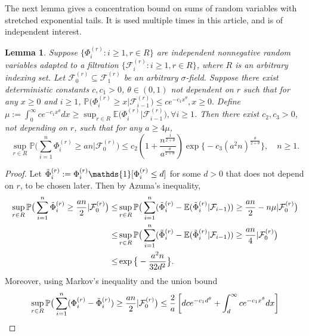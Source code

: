 \documentclass[11pt, reqno]{article}
\newtheorem{lemma}[theorem]{Lemma}
\numberwithin{equation}{section}
\numberwithin{theorem}{section}
\begin{document}
\begin{appendix}
The next lemma gives a concentration bound on sums of random variables with stretched exponential tails. It is used multiple times in this article, and is of independent interest.
\begin{lemma}\label{lem:LEMMA-5}
Suppose $\{\Phi^{(r)}_i:i\geq 1,r\in R\}$ are independent nonnegative random variables adapted to a filtration $\big\{\mathcal{F}^{(r)}_i:i\geq 1, r\in R\big\}$, where $R$ is an arbitrary indexing set. Let $\mathcal{F}^{(r)}_0\subseteq \mathcal{F}^{(r)}_1$ be an arbitrary $\sigma$-field. Suppose there exist deterministic constants $c,c_1>0$, $\theta \in (0,1)$ not dependent on $r$  such that for any $x\geq0$ and $i\geq 1$, $\mathbb{P}\big(\Phi^{(r)}_i\geq x|\mathcal{F}^{(r)}_{i-1}\big)\leq ce^{-c_1x^{\theta}},x\geq 0.$
Define $\mu :=\int_0^{\infty}ce^{-c_1x^{\theta}} dx\geq \sup_{r\in R}\mathbb{E}\big(\Phi^{(r)}_i|\mathcal{F}^{(r)}_{i-1}\big),\forall i\geq 1$.
Then there exist $c_2,c_3>0$, not depending on $r$, such that for any $a\geq 4\mu $,
$$\sup_{r\in R}\mathbb{P}\big(\sum_{i=1}^{n}\Phi^{(r)}_i \geq an|\mathcal{F}^{(r)}_0\big)\leq c_2\left(1+\frac{n^{\frac{1}{2+\theta}}}{a^{\frac{\theta}{2+\theta}}}\right)\exp \big\{-c_3(a^2n)^{\frac{\theta}{2+\theta}}\big\},\quad n\geq 1.$$
\end{lemma}
\begin{proof}
Let $\Tilde{\Phi}^{(r)}_i:=\Phi^{(r)}_i\mathds{1}[\Phi^{(r)}_i\leq d]$ for some $d>0$ that does not depend on $r$, to be chosen later. Then by Azuma's inequality,
\begin{equation}
\begin{split}\label{eq:lem4.5-1}
    \sup_{r\in R}\mathbb{P}\big(\sum_{i=1}^{n}\Tilde{\Phi}^{(r)}_i\geq \frac{an}{2}|\mathcal{F}^{(r)}_0\big)
    \leq & \sup_{r\in R}\mathbb{P}\big(\sum_{i=1}^{n}(\Tilde{\Phi}^{(r)}_i-\mathbb{E}(\Tilde{\Phi}^{(r)}_i|\mathcal{F}_{i-1}))\geq \frac{an}{2}-n\mu|\mathcal{F}^{(r)}_0\big)\\
    \leq & \sup_{r\in R}\mathbb{P}\big(\sum_{i=1}^{n}(\Tilde{\Phi}^{(r)}_i-\mathbb{E}(\Tilde{\Phi}^{(r)}_i|\mathcal{F}_{i-1}))\geq \frac{an}{4}|\mathcal{F}^{(r)}_0\big)\\
    \leq &\exp \big\{-\frac{a^2n}{32d^2 }\big\}.
\end{split}
\end{equation}
Moreover, using Markov's inequality and the union bound 
\begin{equation}
    \label{eq:lem4.5-2}
    \sup_{r\in R} \mathbb{P}\big(\sum_{i=1}^n (\Phi^{(r)}_i-\Tilde{\Phi}^{(r)}_i)\geq \frac{an}{2}|\mathcal{F}^{(r)}_0\big)\leq \frac{2}{a}\left[dce^{-c_1d^{\theta}} + \int_d^{\infty}ce^{-c_1x^{\theta}}dx\right]

\end{equation}
\end{proof}
\end{appendix}
\end{document}
